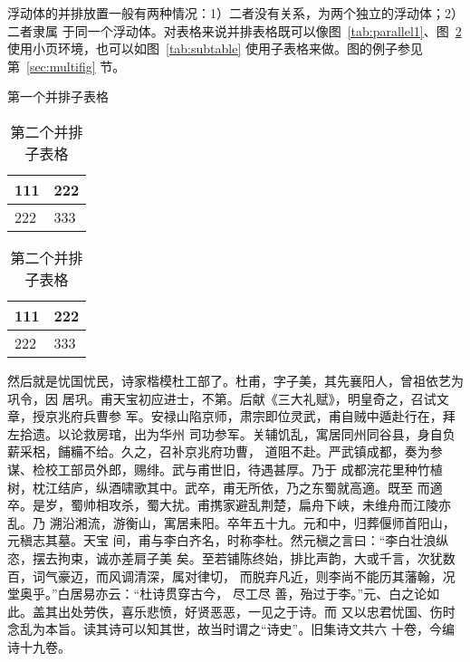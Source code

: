 浮动体的并排放置一般有两种情况：1）二者没有关系，为两个独立的浮动体；2）二者隶属
于同一个浮动体。对表格来说并排表格既可以像图~\ref{tab:parallel1}、图~\ref{tab:parallel2} 
使用小页环境，也可以如图~\ref{tab:subtable} 使用子表格来做。图的例子参见第~\ref{sec:multifig} 节。
\begin{table}[h]
\noindent\begin{minipage}{0.5\textwidth}
\centering
\caption{第一个并排子表格}
\label{tab:parallel1}
\begin{tabular}{p{2cm}p{2cm}}
\toprule[1.5pt]
111 & 222 \\\midrule[1pt]
222 & 333 \\\bottomrule[1.5pt]
\end{tabular}
\end{minipage}
\begin{minipage}{0.5\textwidth}
\centering
\caption{第二个并排子表格}
\label{tab:parallel2}
\begin{tabular}{p{2cm}p{2cm}}
\toprule[1.5pt]
111 & 222 \\\midrule[1pt]
222 & 333 \\\bottomrule[1.5pt]
\end{tabular}
\end{minipage}
\end{table}

然后就是忧国忧民，诗家楷模杜工部了。杜甫，字子美，其先襄阳人，曾祖依艺为巩令，因
居巩。甫天宝初应进士，不第。后献《三大礼赋》，明皇奇之，召试文章，授京兆府兵曹参
军。安禄山陷京师，肃宗即位灵武，甫自贼中遁赴行在，拜左拾遗。以论救房琯，出为华州
司功参军。关辅饥乱，寓居同州同谷县，身自负薪采梠，餔糒不给。久之，召补京兆府功曹，
道阻不赴。严武镇成都，奏为参谋、检校工部员外郎，赐绯。武与甫世旧，待遇甚厚。乃于
成都浣花里种竹植树，枕江结庐，纵酒啸歌其中。武卒，甫无所依，乃之东蜀就高適。既至
而適卒。是岁，蜀帅相攻杀，蜀大扰。甫携家避乱荆楚，扁舟下峡，未维舟而江陵亦乱。乃
溯沿湘流，游衡山，寓居耒阳。卒年五十九。元和中，归葬偃师首阳山，元稹志其墓。天宝
间，甫与李白齐名，时称李杜。然元稹之言曰：“李白壮浪纵恣，摆去拘束，诚亦差肩子美
矣。至若铺陈终始，排比声韵，大或千言，次犹数百，词气豪迈，而风调清深，属对律切，
而脱弃凡近，则李尚不能历其藩翰，况堂奥乎。”白居易亦云：“杜诗贯穿古今，  尽工尽
善，殆过于李。”元、白之论如此。盖其出处劳佚，喜乐悲愤，好贤恶恶，一见之于诗。而
又以忠君忧国、伤时念乱为本旨。读其诗可以知其世，故当时谓之“诗史”。旧集诗文共六
十卷，今编诗十九卷。

\begin{table}
\centering
\caption{并排子表格}
\label{tab:subtable}
\hskip2cm
\end{table}

